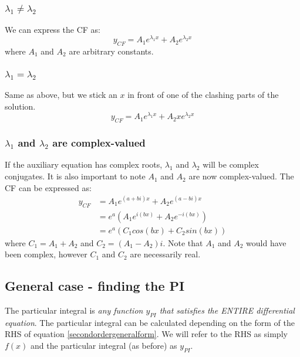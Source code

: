 \documentclass{article}
\begin{document}
\subsubsection{$ \lambda_{1} \neq \lambda_{2} $}
We can express the CF as:
\begin{equation}
y_{CF} = A_{1}e^{\lambda_{1}x} + A_{2}e^{\lambda_{2}x}
\end{equation}
where $ A_{1} $ and $ A_{2} $ are arbitrary constants.

\subsubsection{$ \lambda_{1} = \lambda_{2} $}
Same as above, but we stick an $ x $ in front of one of the clashing parts of the solution.
\begin{equation}
y_{CF} = A_{1}e^{\lambda_{1}x} + A_{2}xe^{\lambda_{2}x}
\end{equation}

\subsubsection{$ \lambda_{1} $ and $ \lambda_{2} $ are complex-valued}
If the auxiliary equation has complex roots, $ \lambda_{1} $ and $ \lambda_{2} $ will be complex conjugates. It is also important to note $ A_{1} $ and $ A_{2} $ are now complex-valued. The CF can be expressed as:
\begin{equation}
\begin{split}
y_{CF} & = A_{1}e^{(a + bi)x} + A_{2}e^{(a - bi)x} \\
       & = e^{a}(A_{1}e^{i(bx)} + A_{2}e^{- i(bx)}) \\
       & = e^{a}(C_{1}cos(bx) + C_{2}sin(bx))
\end{split}
\end{equation}
where $ C_{1} = A_{1} + A_{2} $ and $ C_{2} = (A_{1} - A_{2})i $. Note that $ A_{1} $ and $ A_{2} $ would have been complex, however $ C_{1} $ and $ C_{2} $ are necessarily real.

\subsection{General case - finding the PI}
The particular integral is \emph{any function $ y_{PI} $ that satisfies the ENTIRE differential equation}. The particular integral can be calculated depending on the form of the RHS of equation \ref{secondordergeneralform}. We will refer to the RHS as simply $ f(x) $ and the particular integral (as before) as $ y_{PI} $.
\end{document}
